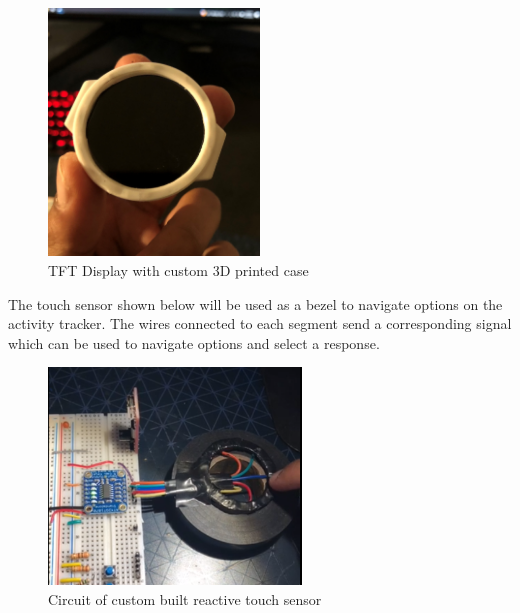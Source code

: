 \documentclass[12pt, titlepage]{article}
\begin{document}
\begin{figure}[H]
	\begin{center}
		 \includegraphics[width=0.5\textwidth]{DisplayCase}
		\caption{TFT Display with custom 3D printed case}
		\label{DisplayCase} 
	\end{center}
\end{figure}


The touch sensor shown below will be used as a bezel to navigate options on the activity tracker. The wires connected to each segment send a corresponding signal which can be used to navigate options and select a response.

\begin{figure}[H]
	\begin{center}
		 \includegraphics[width=0.6\textwidth]{TouchSensor}
		\caption{Circuit of custom built reactive touch sensor}
		\label{TouchSensor} 
	\end{center}
\end{figure}
\end{document}
